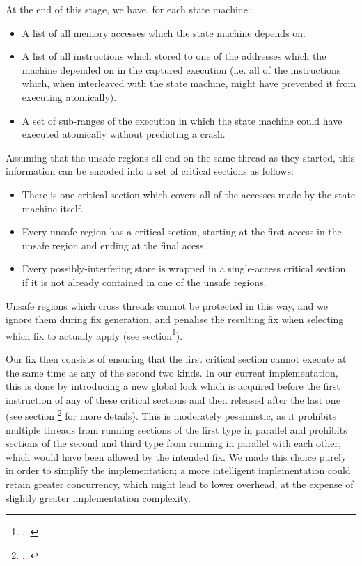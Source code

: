 \documentclass[10pt,twocolumn,preprint,natbib,authoryear]{sigplanconf}
\newcommand{\editorial}[1]{\textcolor{red}{\footnote{\textcolor{red}{#1}}}}
\begin{document}
At the end of this stage, we have, for each state machine:

\begin{itemize}
\item A list of all memory accesses which the state machine depends
  on.
\item A list of all instructions which stored to one of the addresses
  which the machine depended on in the captured execution (i.e. all of
  the instructions which, when interleaved with the state machine,
  might have prevented it from executing atomically).
\item A set of sub-ranges of the execution in which the state machine
  could have executed atomically without predicting a crash.
\end{itemize}

Assuming that the unsafe regions all end on the same thread as they
started, this information can be encoded into a set of critical
sections as follows:

\begin{itemize}
\item There is one critical section which covers all of the accesses
  made by the state machine itself.
\item Every unsafe region has a critical section, starting at the
  first access in the unsafe region and ending at the final acess.
\item Every possibly-interfering store is wrapped in a single-access
  critical section, if it is not already contained in one of the
  unsafe regions.
\end{itemize}

Unsafe regions which cross threads cannot be protected in this way,
and we ignore them during fix generation, and penalise the resulting
fix when selecting which fix to actually apply (see
section\editorial{...}).

Our fix then consists of ensuring that the first critical section
cannot execute at the same time as any of the second two kinds.  In
our current implementation, this is done by introducing a new global
lock which is acquired before the first instruction of any of these
critical sections and then released after the last one (see section
\editorial{...} for more details).  This is moderately pessimistic, as
it prohibits multiple threads from running sections of the first type
in parallel and prohibits sections of the second and third type from
running in parallel with each other, which would have been allowed by
the intended fix.  We made this choice purely in order to simplify the
implementation; a more intelligent implementation could retain greater
concurrency, which might lead to lower overhead, at the expense of
slightly greater implementation complexity.
\end{document}
